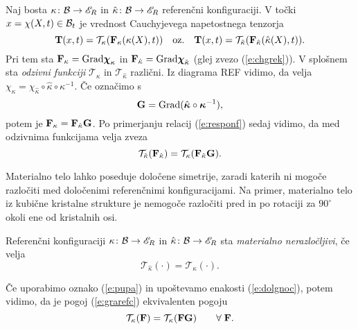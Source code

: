 Naj bosta $\kappa\colon\mathcal B\to\mathscr E_R$ in $\hat{\kappa}\colon\mathcal B\to\mathscr E_R$ referenčni konfiguraciji.
V točki $x=\chi(X,t)\in\mathcal B_t$ je vrednost Cauchyjevega napetostnega tenzorja
\begin{equation} \label{e:responf}
	\mathbf T(x,t)=\mathcal{T}_{\kappa}(\mathbf F_{\kappa}(\kappa(X),t))\quad\textrm{oz.}\quad
	\mathbf T(x,t)=\mathcal{T}_{\hat{\kappa}}(\mathbf F_{\hat{\kappa}}(\hat{\kappa}(X),t)).
\end{equation}
Pri tem sta $\mathbf F_{\kappa}=\mathrm{Grad}\boldsymbol \chi_{\kappa}$ in
$\mathbf F_{\hat{\kappa}}=\mathrm{Grad}\boldsymbol \chi_{\hat{\kappa}}$ (glej zvezo (\ref{e:chgrek})).
V splošnem sta \emph{odzivni funkciji} $\mathcal{T}_{\kappa}$ in $\mathcal{T}_{\hat{\kappa}}$
različni. Iz diagrama REF vidimo, da velja $\chi_{\kappa}=\chi_{\hat{\kappa}}\circ\hat{\kappa}\circ\kappa^{-1}$.
Če označimo s
\begin{equation} \label{e:pupa}
	\mathbf G=\mathrm{Grad}(\hat{\boldsymbol \kappa}\circ\boldsymbol \kappa^{-1}),
\end{equation}
potem je $\mathbf F_{\kappa}=\mathbf F_{\hat{\kappa}}\mathbf G$. Po primerjanju relacij (\ref{e:responf})
sedaj vidimo, da med odzivnima funkcijama velja zveza
\begin{equation} \label{e:dolgnoc}
	\mathcal{T}_{\hat{\kappa}}(\mathbf F_{\hat{\kappa}})
	=\mathcal{T}_{\kappa}(\mathbf F_{\hat{\kappa}}\mathbf G).
\end{equation}

Materialno telo lahko poseduje določene simetrije, zaradi katerih ni mogo\-če razločiti
med določenimi referenčnimi konfiguracijami. Na primer, materialno telo iz
kubične kristalne strukture je nemogoče razločiti pred in po rotaciji za
$90^{\circ}$ okoli ene od kristalnih osi.

\begin{definicija}
	Referenčni konfiguraciji $\kappa\colon\mathcal B\to\mathscr E_R$ in $\hat{\kappa}\colon\mathcal B\to\mathscr E_R$
	sta \emph{materialno nerazločljivi}, če velja
	\begin{equation} \label{e:grarefc}
		\mathcal{T}_{\hat{\kappa}}(\cdot)=\mathcal{T}_{\kappa}(\cdot).
	\end{equation}
\end{definicija}

Če uporabimo oznako (\ref{e:pupa}) in upoštevamo enakosti (\ref{e:dolgnoc}),
potem vidimo, da je pogoj (\ref{e:grarefc}) ekvivalenten pogoju
\begin{equation} \label{e:pogir}
	\mathcal{T}_{\kappa}(\mathbf F)=\mathcal{T}_{\kappa}(\mathbf F\mathbf G)\qquad
	\forall\;\mathbf F.
\end{equation}

